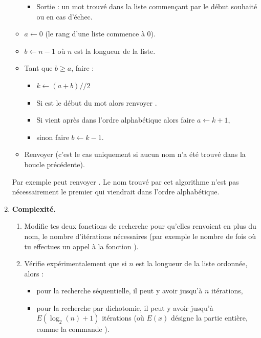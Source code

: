 \documentclass[11pt,class=report,crop=false]{standalone}
\begin{document}
\begin{activite}
\begin{enumerate}
\begin{algorithme}
\begin{itemize}
\begin{itemize}
					\item Sortie : un mot trouvé dans la liste commençant par le début souhaité ou  en cas d'échec. 
					
				\end{itemize}
				
				\item $a \leftarrow 0$ (le rang d'une liste commence à $0$).
				
				\item $b \leftarrow n -1$ où $n$ est la longueur de la liste.
				
				\item Tant que $b \ge a$, faire :
				\begin{itemize}
					\item $k \leftarrow (a+b)//2$
					
					\item Si  est le début du mot \ci{liste[k]} alors renvoyer .
					\item Si  vient après  dans l'ordre alphabétique alors faire $a\leftarrow k+1$,
					\item sinon faire $b \leftarrow k-1$.
				\end{itemize}
				
				\item Renvoyer  (c'est le cas uniquement si aucun nom n'a été trouvé dans la boucle précédente).
				
			\end{itemize}
		\end{algorithme}  
	
		Par exemple  peut renvoyer .
		Le nom trouvé par cet algorithme n'est pas nécessairement le premier qui viendrait dans l'ordre alphabétique.
		
		\item \textbf{Complexité.}
		\begin{enumerate}
			\item Modifie tes deux fonctions de recherche pour qu'elles renvoient en plus du nom, le nombre d'itérations nécessaires (par exemple le nombre de fois où tu effectues un appel à la fonction ).  
			
			\item Vérifie expérimentalement que si $n$ est la longueur de la liste ordonnée, alors :
			\begin{itemize}
				\item pour la recherche séquentielle, il peut y avoir jusqu'à $n$ itérations,
				\item pour la recherche par dichotomie, il peut y avoir jusqu'à $E(\log_2(n)+1)$ itérations (où $E(x)$ désigne la partie entière, comme la commande ).
			\end{itemize}
		\end{enumerate}
		

		
		
	\end{enumerate}
	
\end{activite}
\end{document}
